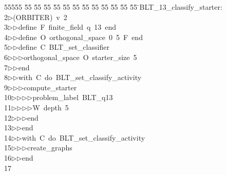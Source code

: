 %
%
\begin{tabbing}
55555 \= 55 \= 55 \= 55 \= 55 \= 55 \= 55 \= 55 \= 55 \= 55 \= 55 \= 55 \= 55 \= \>BLT\_13\_classify\_starter:\\[0pt]
2\>$\triangleright$\>(ORBITER)\ v\ 2\ \\[0pt]
3\>$\triangleright$\>$\triangleright$\>define\ F\ finite\_field\ q\ 13\ end\ \\[0pt]
4\>$\triangleright$\>$\triangleright$\>define\ O\ orthogonal\_space\ 0\ 5\ F\ end\ \\[0pt]
5\>$\triangleright$\>$\triangleright$\>define\ C\ BLT\_set\_classifier\ \\[0pt]
6\>$\triangleright$\>$\triangleright$\>$\triangleright$\>orthogonal\_space\ O\ starter\_size\ 5\ \\[0pt]
7\>$\triangleright$\>$\triangleright$\>end\ \\[0pt]
8\>$\triangleright$\>$\triangleright$\>with\ C\ do\ BLT\_set\_classify\_activity\ \\[0pt]
9\>$\triangleright$\>$\triangleright$\>$\triangleright$\>compute\_starter\ \\[0pt]
10\>$\triangleright$\>$\triangleright$\>$\triangleright$\>$\triangleright$\>problem\_label\ BLT\_q13\ \\[0pt]
11\>$\triangleright$\>$\triangleright$\>$\triangleright$\>$\triangleright$\>W\ depth\ 5\ \\[0pt]
12\>$\triangleright$\>$\triangleright$\>$\triangleright$\>end\ \\[0pt]
13\>$\triangleright$\>$\triangleright$\>end\ \\[0pt]
14\>$\triangleright$\>$\triangleright$\>with\ C\ do\ BLT\_set\_classify\_activity\ \\[0pt]
15\>$\triangleright$\>$\triangleright$\>$\triangleright$\>create\_graphs\ \\[0pt]
16\>$\triangleright$\>$\triangleright$\>end\\[0pt]
17\>\end{tabbing}
